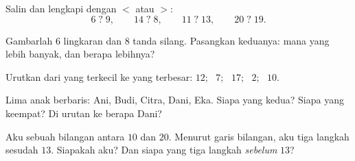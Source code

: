 \begin{exercise}[$\star$]\label{exo:g1:counting:5}
Salin dan lengkapi dengan $<$ atau $>$:
\[
6 \;?\; 9, \qquad
14 \;?\; 8, \qquad
11 \;?\; 13, \qquad
20 \;?\; 19 .
\]
\end{exercise}

\begin{exercise}[$\star$]\label{exo:g1:counting:6}
Gambarlah $6$ lingkaran dan $8$ tanda silang. Pasangkan keduanya: mana
yang lebih banyak, dan berapa lebihnya?
\end{exercise}

\begin{exercise}[$\star$]\label{exo:g1:counting:7}
Urutkan dari yang terkecil ke yang terbesar: $12$; \ $7$; \ $17$; \ $2$; \ $10$.
\end{exercise}

\begin{exercise}[$\star$]\label{exo:g1:counting:8}
Lima anak berbaris: Ani, Budi, Citra, Dani, Eka. Siapa yang kedua?
Siapa yang keempat? Di urutan ke berapa Dani?
\end{exercise}

\begin{exercise}[$\star\star$]\label{exo:g1:counting:9}
Aku sebuah bilangan antara $10$ dan $20$. Menurut garis bilangan, aku
tiga langkah sesudah $13$. Siapakah aku? Dan siapa yang tiga langkah
\emph{sebelum} $13$?

\end{exercise}
